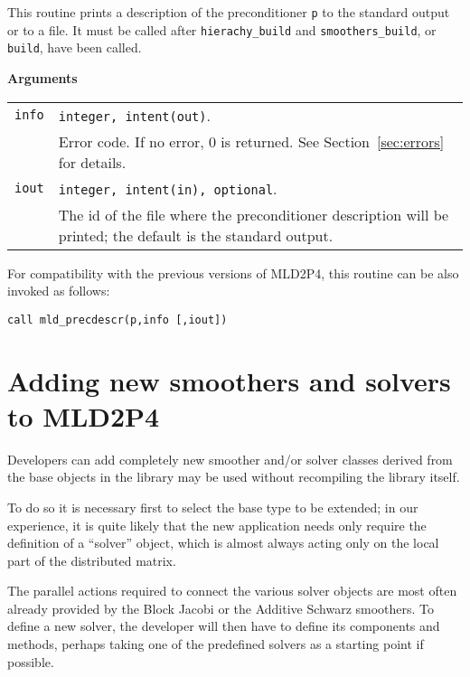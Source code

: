 \noindent
This routine prints a description of the preconditioner \verb|p| to the standard output or
to a file. It must be called after \verb|hierachy_build| and \verb|smoothers_build|,
or \verb|build|, have been called.

{\baselineskip\noindent\large\bfseries Arguments} \smallskip

\begin{tabular}{p{1.2cm}p{12cm}}
\verb|info|   & \verb|integer, intent(out)|.\\
              & Error code. If no error, 0 is returned. See Section~\ref{sec:errors} for details.\\
\verb|iout|   & \verb|integer, intent(in), optional|.\\
              & The id of the file where the preconditioner description
                will be printed; the default is the standard output.\\
\end{tabular}

\baselineskip
For compatibility with the previous versions of MLD2P4, this routine can be also invoked
as follows:

\begin{center}
\verb|call mld_precdescr(p,info [,iout])|
\end{center}


\clearpage

\section{Adding new  smoothers and solvers to MLD2P4\label{sec:adding}}

Developers can add completely new smoother and/or solver classes
derived from the base objects in the library may be used without
recompiling the library itself. 

To do so it is necessary first to select the base type to be extended;
in our experience, it is quite likely that the new application needs
only require the definition of a ``solver'' object, which is almost
always acting only on the local part of the distributed matrix. 

The parallel actions required to connect the various solver objects
are most often already provided by the Block Jacobi or the Additive
Schwarz smoothers.  To define a new solver, the developer will then
have to define its components and methods, perhaps taking one of the
predefined solvers as a starting point if possible. 


